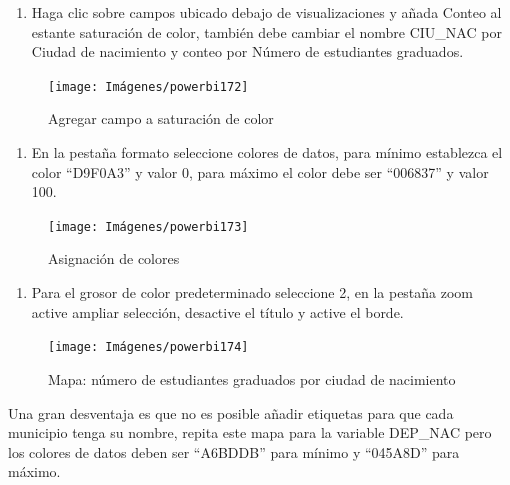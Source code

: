 \documentclass[
]{book}
\providecommand{\tightlist}{%
  \setlength{\itemsep}{0pt}\setlength{\parskip}{0pt}}
\begin{document}
\begin{enumerate}
\def\labelenumi{\arabic{enumi}.}
\setcounter{enumi}{7}
\tightlist
\item
  Haga clic sobre campos ubicado debajo de visualizaciones y añada Conteo al estante saturación de color, también debe cambiar el nombre CIU\_NAC por Ciudad de nacimiento y conteo por Número de estudiantes graduados.
\end{enumerate}

\begin{figure}

{\centering \texttt{[image: Imágenes/powerbi172]} 

}

\caption{Agregar campo a saturación de color}\label{fig:paso8mapadeformas-fig}
\end{figure}

\begin{enumerate}
\def\labelenumi{\arabic{enumi}.}
\setcounter{enumi}{8}
\tightlist
\item
  En la pestaña formato seleccione colores de datos, para mínimo establezca el color ``D9F0A3'' y valor 0, para máximo el color debe ser ``006837'' y valor 100.
\end{enumerate}

\begin{figure}

{\centering \texttt{[image: Imágenes/powerbi173]} 

}

\caption{Asignación de colores}\label{fig:paso9mapadeformas-fig}
\end{figure}

\begin{enumerate}
\def\labelenumi{\arabic{enumi}.}
\setcounter{enumi}{9}
\tightlist
\item
  Para el grosor de color predeterminado seleccione 2, en la pestaña zoom active ampliar selección, desactive el título y active el borde.
\end{enumerate}

\begin{figure}

{\centering \texttt{[image: Imágenes/powerbi174]} 

}

\caption{Mapa: número de estudiantes graduados por ciudad de nacimiento}\label{fig:paso10mapadeformas-fig}
\end{figure}

Una gran desventaja es que no es posible añadir etiquetas para que cada municipio tenga su nombre, repita este mapa para la variable DEP\_NAC pero los colores de datos deben ser ``A6BDDB'' para mínimo y ``045A8D'' para máximo.
\end{document}
